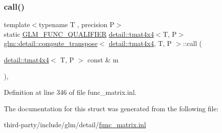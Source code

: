 \subsubsection{\texorpdfstring{call()}{call()}}
{\footnotesize\ttfamily template$<$typename T , precision P$>$ \\
static \hyperlink{setup_8hpp_a33fdea6f91c5f834105f7415e2a64407}{G\+L\+M\+\_\+\+F\+U\+N\+C\+\_\+\+Q\+U\+A\+L\+I\+F\+I\+ER} \hyperlink{structglm_1_1detail_1_1tmat4x4}{detail\+::tmat4x4}$<$T, P$>$ \hyperlink{structglm_1_1detail_1_1compute__transpose}{glm\+::detail\+::compute\+\_\+transpose}$<$ \hyperlink{structglm_1_1detail_1_1tmat4x4}{detail\+::tmat4x4}, T, P $>$\+::call (\begin{DoxyParamCaption}\item[{\hyperlink{structglm_1_1detail_1_1tmat4x4}{detail\+::tmat4x4}$<$ T, P $>$ const \&}]{m }\end{DoxyParamCaption})\hspace{0.3cm}{\ttfamily [inline]}, {\ttfamily [static]}}



Definition at line 346 of file func\+\_\+matrix.\+inl.



The documentation for this struct was generated from the following file\+:\begin{DoxyCompactItemize}
\item 
third-\/party/include/glm/detail/\hyperlink{func__matrix_8inl}{func\+\_\+matrix.\+inl}\end{DoxyCompactItemize}
